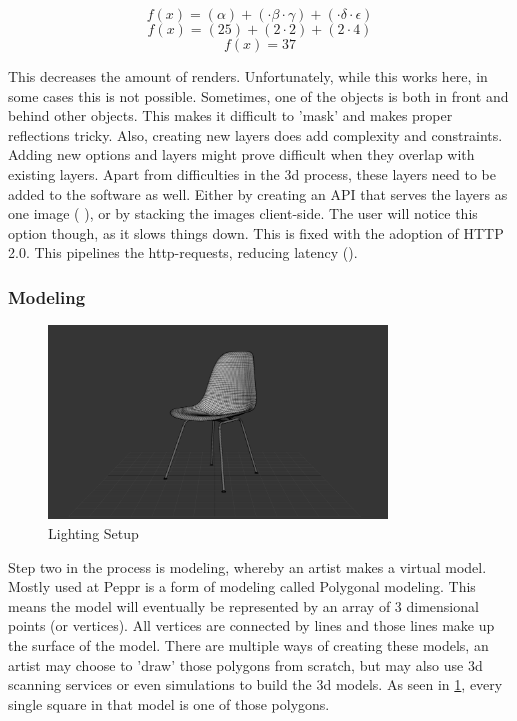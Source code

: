 \[ f(x) = (\alpha) + (\cdot \beta \cdot \gamma) + (\cdot \delta \cdot \epsilon)\]
\[ f(x) = (25) + (2 \cdot 2) + (2 \cdot 4)\]
\[ f(x) = 37\]

This decreases the amount of renders. Unfortunately, while this works here, in some cases this is not possible. Sometimes, one of the objects is both in front and behind other objects. This makes it difficult to 'mask' and makes proper reflections tricky. Also, creating new layers does add complexity and constraints. Adding new options and layers might prove difficult when they overlap with existing layers.
\newline
Apart from difficulties in the 3d process, these layers need to be added to the software as well. Either by creating an API that serves the layers as one image (\cite{bugaboo} ), or by stacking the images client-side. The user will notice this option though, as it slows things down. This is fixed with the adoption of HTTP 2.0. This pipelines the http-requests, reducing latency (\cite{latency}).

\subsubsection{Modeling}

\begin{figure}
\vspace{-1cm}
\centering
\includegraphics[width=9cm]{images/modeling}
\caption{Lighting Setup}
\label{figure:modeling}
\end{figure}


Step two in the process is modeling, whereby an artist makes a virtual model. Mostly used at Peppr is a form of modeling called Polygonal modeling. This means the model will eventually be represented by an array of 3 dimensional points (or vertices). All vertices are connected by lines and those lines make up the surface of the model. There are multiple ways of creating these models, an artist may choose to 'draw' those polygons from scratch, but may also use 3d scanning services or even simulations to build the 3d models.
As seen in \ref{figure:modeling}, every single square in that model is one of those polygons.

